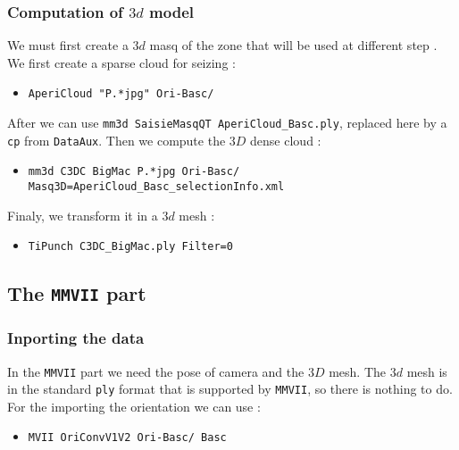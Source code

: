 
\subsubsection{Computation of $3d$ model}

We must first create a $3d$ masq of the zone that will be used at different step .
We first create a sparse cloud for seizing :

\begin{itemize}
	\item {\tt AperiCloud "P.*jpg" Ori-Basc/}
\end{itemize}

After we can use {\tt mm3d SaisieMasqQT AperiCloud\_Basc.ply}, 
replaced here by a {\tt cp} from {\tt DataAux}.
Then we compute the $3D$ dense cloud :

\begin{itemize}
	\item {\tt mm3d C3DC BigMac P.*jpg Ori-Basc/ Masq3D=AperiCloud\_Basc\_selectionInfo.xml}
\end{itemize}

Finaly, we transform it in a $3d$ mesh :

\begin{itemize}
	\item {\tt TiPunch C3DC\_BigMac.ply Filter=0}
\end{itemize}


\subsection{The  {\tt MMVII} part}


\subsubsection{Inporting the data}

In the {\tt MMVII} part we need the pose of camera and the $3D$ mesh. The $3d$ mesh is 
in the standard  {\tt ply} format that is supported by  {\tt MMVII}, so there is nothing
to do. For the importing the orientation  we can use :

\begin{itemize}
	\item {\tt MVII OriConvV1V2 Ori-Basc/ Basc}
\end{itemize}

